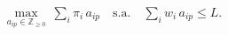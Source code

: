 \documentclass[preview]{standalone}
\begin{document}
\begin{align*}
\max_{a_{ip}\in\mathbb{Z}_{\ge 0}}~ \sum_i \pi_i\,a_{ip} \quad \text{s.a.}\quad \sum_i w_i\,a_{ip} \le L.
\end{align*}
\end{document}
